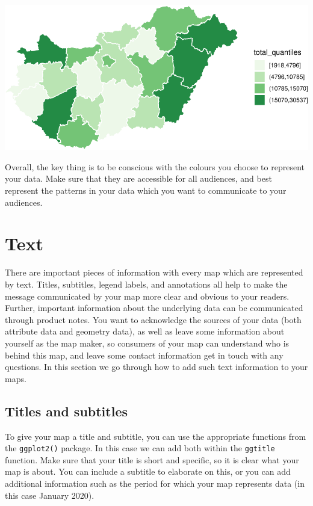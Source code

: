 \documentclass[
]{book}
\begin{document}
\includegraphics{crime_mapping_files/figure-latex/unnamed-chunk-159-1.pdf}

Overall, the key thing is to be conscious with the colours you choose to represent your data. Make sure that they are accessible for all audiences, and best represent the patterns in your data which you want to communicate to your audiences.

\hypertarget{text}{%
\section{Text}\label{text}}

There are important pieces of information with every map which are represented by text. Titles, subtitles, legend labels, and annotations all help to make the message communicated by your map more clear and obvious to your readers. Further, important information about the underlying data can be communicated through product notes. You want to acknowledge the sources of your data (both attribute data and geometry data), as well as leave some information about yourself as the map maker, so consumers of your map can understand who is behind this map, and leave some contact information get in touch with any questions. In this section we go through how to add such text information to your maps.

\hypertarget{titles-and-subtitles}{%
\subsection{Titles and subtitles}\label{titles-and-subtitles}}

To give your map a title and subtitle, you can use the appropriate functions from the \texttt{ggplot2()} package. In this case we can add both within the \texttt{ggtitle} function. Make sure that your title is short and specific, so it is clear what your map is about. You can include a subtitle to elaborate on this, or you can add additional information such as the period for which your map represents data (in this case January 2020).
\end{document}
